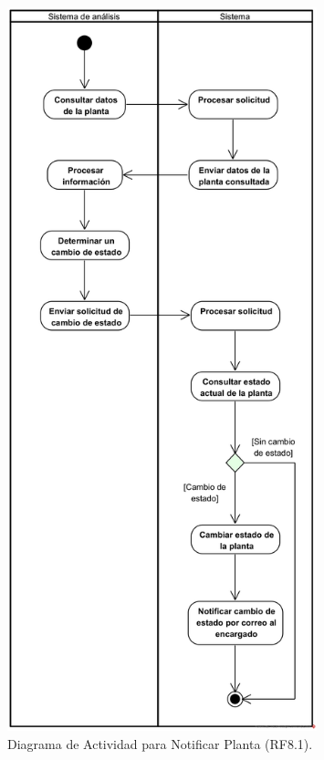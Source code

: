 \begin{figure}[H]
	\centering
	\caption{Diagrama de Actividad para Notificar Planta (RF8.1).}
 \includegraphics[width=0.8\textwidth]{UML/Actividad/Diagrama de Actividad RF8.1 Notificar Planta.png}
\end{figure}


